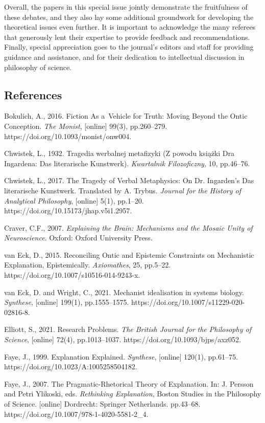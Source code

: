 Overall, the papers in this special issue jointly demonstrate the fruitfulness of these debates, and they also lay some additional groundwork for developing the theoretical issues even further. It is important to acknowledge the many referees that generously lent their expertise to provide feedback and recommendations. Finally, special appreciation goes to the journal's editors and staff for providing guidance and assistance, and for their dedication to intellectual discussion in philosophy of science.

\subsection{References}

Bokulich, A., 2016. Fiction As a~Vehicle for Truth: Moving Beyond the Ontic Conception. \textit{The Monist}, [online] 99(3), pp.260–279. https://doi.org/10.1093/monist/onw004.

Chwistek, L., 1932. Tragedia werbalnej metafizyki (Z powodu książki Dra Ingardena: Das literarische Kunstwerk). \textit{Kwartalnik Filozoficzny}, 10, pp.46–76.

Chwistek, L., 2017. The Tragedy of Verbal Metaphysics: On Dr. Ingarden's Das literarische Kunstwerk. Translated by A. Trybus. \textit{Journal for the History of Analytical Philosophy}, [online] 5(1), pp.1–20. https://doi.org/10.15173/jhap.v5i1.2957.

Craver, C.F., 2007. \textit{Explaining the Brain: Mechanisms and the Mosaic Unity of Neuroscience}. Oxford: Oxford University Press.

van Eck, D., 2015. Reconciling Ontic and Epistemic Constraints on Mechanistic Explanation, Epistemically. \textit{Axiomathes}, 25, pp.5–22. https://doi.org/10.1007/s10516-014-9243-x.

van Eck, D. and Wright, C., 2021. Mechanist idealisation in systems biology. \textit{Synthese}, [online] 199(1), pp.1555–1575. https://doi.org/10.1007/s11229-020-02816-8.

Elliott, S., 2021. Research Problems. \textit{The British Journal for the Philosophy of Science}, [online] 72(4), pp.1013–1037. https://doi.org/10.1093/bjps/axz052.

Faye, J., 1999. Explanation Explained. \textit{Synthese}, [online] 120(1), pp.61–75. https://doi.org/10.1023/A:1005258504182.

Faye, J., 2007. The Pragmatic-Rhetorical Theory of Explanation. In: J. Persson and Petri Ylikoski, eds. \textit{Rethinking Explanation}, Boston Studies in the Philosophy of Science. [online] Dordrecht: Springer Netherlands. pp.43–68. https://doi.org/10.1007/978-1-4020-5581-2\_4.

